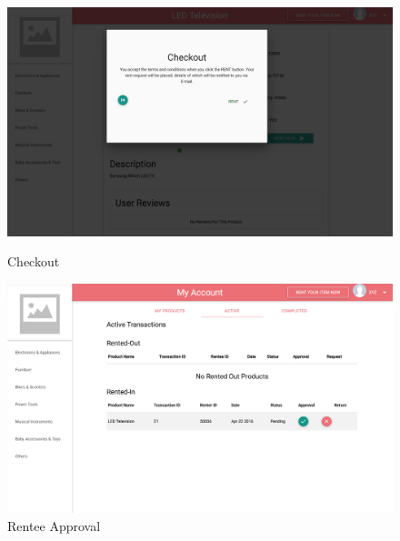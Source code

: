 \documentclass[11pt]{report}
\begin{document}
    \begin{figure}[h]
  \centering
    \includegraphics[width=6in]{checkout.png} 
	\caption{Checkout}
\vspace{0.5in}
  \centering
    \includegraphics[width=6in]{approval.png} 
	\caption{Rentee Approval}
	\end{figure}
\end{document}
